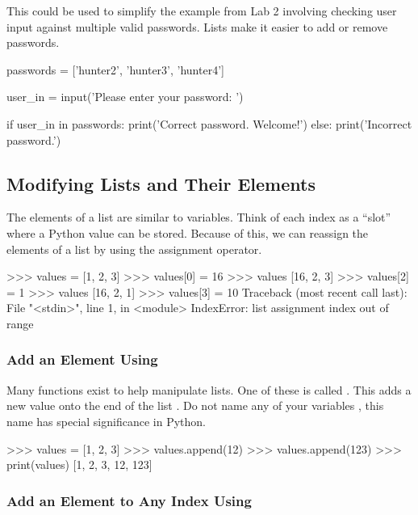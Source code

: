 \documentclass[11pt]{cselabheader}
\begin{document}
This could be used to simplify the example from Lab 2 involving checking user
input against multiple valid passwords. Lists make it easier to add or remove
passwords.

\begin{python3code}
passwords = ['hunter2', 'hunter3', 'hunter4']

user_in = input('Please enter your password: ')

if user_in in passwords:
    print('Correct password. Welcome!')
else:
    print('Incorrect password.')
\end{python3code}



\subsection{Modifying Lists and Their Elements}
The elements of a list are similar to variables.
Think of each index as a ``slot'' where a Python value can be stored.
Because of this, we can reassign the elements of a list by
using the assignment operator.

\begin{pyconcode}
>>> values = [1, 2, 3]
>>> values[0] = 16
>>> values
[16, 2, 3]
>>> values[2] = 1
>>> values
[16, 2, 1]
>>> values[3] = 10
Traceback (most recent call last):
  File "<stdin>", line 1, in <module>
IndexError: list assignment index out of range

\end{pyconcode}

\subsubsection{Add an Element Using }

Many functions exist to help manipulate lists. One of these is called
. This adds a new value  onto
the end of the list . Do not name any of your variables ,
this name has special significance in Python.

\begin{pyconcode}
>>> values = [1, 2, 3]
>>> values.append(12)
>>> values.append(123)
>>> print(values)
[1, 2, 3, 12, 123]

\end{pyconcode}

\subsubsection{Add an Element to Any Index Using }
\end{document}
